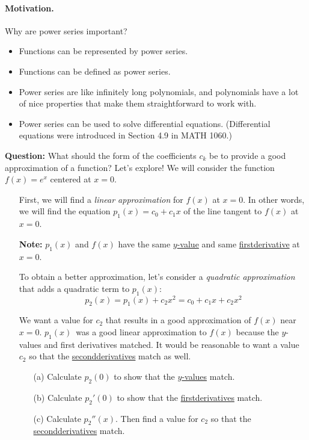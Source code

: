 \documentclass[12pt]{article}
\begin{document}
\paragraph*{Motivation.} Why are power series important?
\begin{itemize}
\item Functions can be represented by power series.
\item Functions can be defined as power series.
\item Power series are like infinitely long polynomials, and polynomials have a lot of nice properties that make them straightforward to work with.
\item Power series can be used to solve differential equations. (Differential equations were introduced in Section 4.9 in MATH 1060.)
\end{itemize}

\newpage

\textbf{Question:} What should the form of the coefficients $c_k$ be to provide a good approximation of a function? Let's explore! We will consider the function $f(x)=e^x$ centered at $x=0$.

\begin{enumerate}
	\item[\tc{1}] First, we will find a \textit{linear approximation} for $f(x)$ at $x=0$. In other words, we will find the equation $p_1(x)=c_0+c_1 x$ of the line tangent to $f(x)$ at $x=0$.
	
	\vfill
	
	\vfill

	\textbf{Note:} $p_1(x)$ and $f(x)$ have the same \underline{$y$-value} and same \underline{first\phantom{y}derivative} at $x=0$.
	
	\item[\tc{2}] To obtain a better approximation, let's consider a \textit{quadratic approximation} that adds a quadratic term to $p_1(x)$:
	$$p_2(x)=p_1(x)+c_2x^2=c_0+c_1x+c_2x^2$$
	
	We want a value for $c_2$ that results in a good approximation of $f(x)$ near \mbox{$x=0$.} $p_1(x)$~was a good linear approximation to $f(x)$ because the $y$-values and first derivatives matched. It would be reasonable to want a value $c_2$ so that the \underline{second\phantom{y}derivatives} match as well.

\begin{enumerate}
	\item[(a)] Calculate $p_2(0)$ to show that the \underline{$y$-values} match.
	
	\vfill
	
	\item[(b)] Calculate $p_2'(0)$ to show that the \underline{first\phantom{y}derivatives} match.
	
	\vfill
	
	\item[(c)] Calculate $p_2''(x)$. Then find a value for $c_2$ so that the \underline{second\phantom{y}derivatives} match.
	
		\vfill

\end{enumerate}
\end{enumerate}
\end{document}
